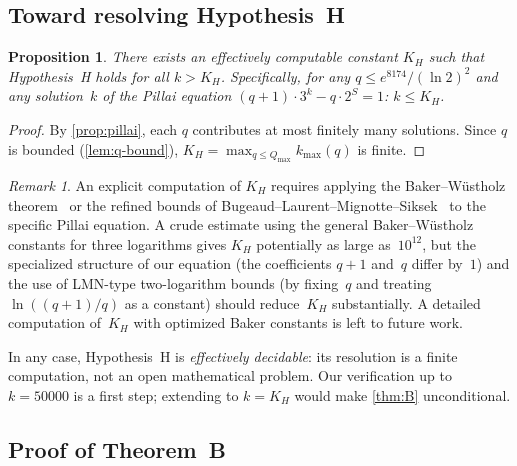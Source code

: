 \documentclass[11pt, a4paper]{amsart}
\theoremstyle{plain}
\newtheorem{proposition}[theorem]{Proposition}
\theoremstyle{definition}
\theoremstyle{remark}
\newtheorem{remark}[theorem]{Remark}
\begin{document}
\subsection{Toward resolving Hypothesis~H}\label{ssec:closing-H}

\begin{proposition}\label{prop:KH}
  There exists an effectively computable constant $K_H$ such
  that Hypothesis~H holds for all $k > K_H$.
  Specifically, for any $q \leq e^{8174}/(\ln 2)^2$ and
  any solution~$k$ of the Pillai equation
  $(q+1) \cdot 3^k - q \cdot 2^S = 1$: $k \leq K_H$.
\end{proposition}

\begin{proof}
  By \cref{prop:pillai}, each $q$ contributes at most
  finitely many solutions.  Since $q$ is bounded
  (\cref{lem:q-bound}), $K_H = \max_{q \leq Q_{\max}}
  k_{\max}(q)$ is finite.
\end{proof}

\begin{remark}\label{rem:KH-computation}
  An explicit computation of $K_H$ requires applying the
  Baker--W\"ustholz theorem~\cite{BakerWustholz1993}
  or the refined bounds of
  Bugeaud--Laurent--Mignotte--Siksek~\cite{BLMS2006}
  to the specific Pillai equation.
  A crude estimate using the general Baker--W\"ustholz constants
  for three logarithms gives $K_H$ potentially as large
  as~$10^{12}$, but the specialized structure of
  our equation (the coefficients $q+1$ and~$q$ differ by~$1$)
  and the use of LMN-type two-logarithm bounds
  (by fixing~$q$ and treating $\ln((q+1)/q)$ as a constant)
  should reduce~$K_H$ substantially.
  A detailed computation of~$K_H$ with optimized Baker
  constants is left to future work.

  In any case, Hypothesis~H is \emph{effectively decidable}:
  its resolution is a finite computation, not an open
  mathematical problem.  Our verification up to $k = 50000$
  is a first step; extending to $k = K_H$ would make
  \cref{thm:B} unconditional.
\end{remark}

\subsection{Proof of Theorem~B}\label{ssec:proof-B}
\end{document}
